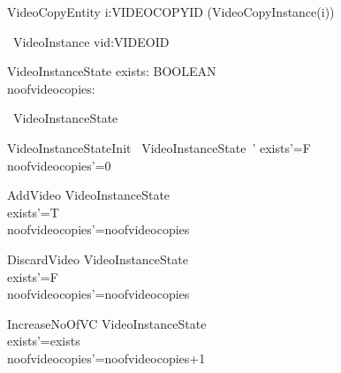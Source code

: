 \documentclass{article}
\begin{document}
\begin{circus}
\circend
\end{circus}

\begin{circus}
    \circprocess VideoCopyEntity \circdef i:VIDEOCOPYID \circspot (VideoCopyInstance(i))  \\

\end{circus}


\begin{circus}
    \circprocess\ VideoInstance \circdef vid:VIDEOID \circspot \circbegin
\end{circus}

\begin{schema}{VideoInstanceState}
	exists: BOOLEAN\\
	noofvideocopies:\nat
\end{schema}

\begin{circusaction}
   \circstate\ VideoInstanceState
\end{circusaction}

\begin{schema}{VideoInstanceStateInit}
    ~VideoInstanceState~'
\where
    exists'=F \\
    noofvideocopies'=0\\
\end{schema}

\begin{schema}{AddVideo}
   \Delta VideoInstanceState \\
    \where
	exists'=T\\
	noofvideocopies'=noofvideocopies\\
\end{schema}

\begin{schema}{DiscardVideo}
   \Delta VideoInstanceState \\
    \where
	exists'=F\\
	noofvideocopies'=noofvideocopies\\
\end{schema}

\begin{schema}{IncreaseNoOfVC}
   \Delta VideoInstanceState \\
    \where
	exists'=exists\\
	noofvideocopies'=noofvideocopies+1\\
\end{schema}
\end{document}

